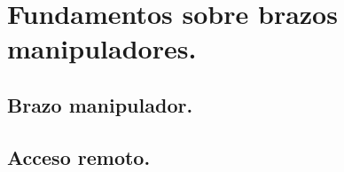 \section{Fundamentos sobre brazos manipuladores.}
\subsection{Brazo manipulador.}

\subsection{Acceso remoto.}

